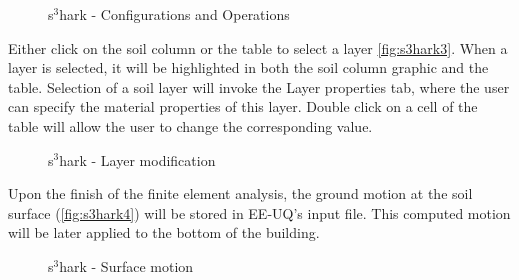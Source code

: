 \begin{figure}[!htbp]
  \caption{s$^3$hark - Configurations and Operations }
  \label{fig:s3hark2}
\end{figure}

Either click on the soil column or the table to select a layer \autoref{fig:s3hark3}. 
When a layer is selected, it will be highlighted in both the soil column graphic and the table. 
Selection of a soil layer will invoke the Layer properties tab, where the user can specify the material properties of this layer.
Double click on a cell of the table will allow the user to change the corresponding value.

\begin{figure}[!htbp]
  \caption{s$^3$hark - Layer modification }
  \label{fig:s3hark3}
\end{figure}


Upon the finish of the finite element analysis, the ground motion at the soil surface (\autoref{fig:s3hark4}) will be stored in EE-UQ's input file.
This computed motion will be later applied to the bottom of the building.

\begin{figure}[!htbp]
  \caption{s$^3$hark - Surface motion }
  \label{fig:s3hark4}
\end{figure}
